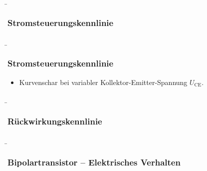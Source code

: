 \begin{frame}
    \b{ \frametitle{Stromsteuerungskennlinie}
\begin{figure}
    \centering
\begin{minipage}[b]{0.48\textwidth}
                \raggedright
                                 \scalebox{0.9}{}
            \end{minipage}
            \begin{minipage}[b]{0.48\textwidth}
                \raggedleft

                 \scalebox{1}{}
            \end{minipage}
\end{figure}
\begin{itemize}
    \end{itemize}
    }
\end{frame}

\begin{frame}
    \b{
\frametitle{Stromsteuerungskennlinie}
\begin{itemize}
    \item Kurvenschar bei variabler Kollektor-Emitter-Spannung $U_\mathrm{CE}$.
    \end{itemize}
\begin{figure}
    \centering
    \scalebox{0.9}{}
\end{figure}
    }
\end{frame}

\begin{frame}
    \b{ \frametitle{Rückwirkungskennlinie}
\begin{figure}
    \centering
    
\end{figure}
    }
\end{frame}

\begin{frame}
    \b{ \frametitle{Bipolartransistor -- Elektrisches Verhalten}
        \begin{figure}[H]
            \centering
            
        \end{figure}
    }
\end{frame}

